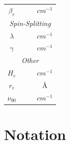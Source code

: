 \documentclass[11pt, twoside, fleqn]{report}
\begin{document}
\begin{table}[H]
\begin{tabular}{cccc}
        $\beta_e$     &                           &                         & $\unit{cm^{-1}}$ \\
        \multicolumn{4}{c}{\textit{Spin-Splitting}}                                            \\
        \cmidrule(lr){1-4}
        $\lambda$     &                           &                         & $\unit{cm^{-1}}$ \\
        $\gamma$      &                           &                         & $\unit{cm^{-1}}$ \\
        \multicolumn{4}{c}{\textit{Other}}                                                     \\
        \cmidrule(lr){1-4}
        $H_e$         &                           &                         & $\unit{cm^{-1}}$ \\
        $r_e$         &                           &                         & \AA              \\
        $\nu_{00}$    &                           &                         & $\unit{cm^{-1}}$ \\
        \bottomrule
    \end{tabular}
\end{table}

\chapter{Notation}
\label{a:notation}
\end{document}
